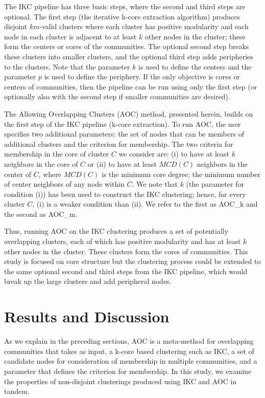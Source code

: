 \documentclass[12pt, oneside]{article}   	%
\begin{document}
The IKC pipeline has three basic steps, where the second and third steps are optional.  The first step (the iterative k-core extraction algorithm) produces disjoint $km$-valid clusters where each cluster has positive modularity and each node in each cluster is adjacent to at least $k$ other nodes in the cluster; these form the centers or cores of the communities. The optional second step breaks these clusters into smaller clusters, and the optional third step adds peripheries to the clusters.  Note that the parameter $k$ is used to define the centers and the parameter $p$ is used to define the periphery. If the only objective is cores or centers of communities, then the pipeline can be run using only the first step (or optionally also with the second step if smaller communities are desired).

The Allowing Overlapping Clusters (AOC) method, presented herein, builds on the first step of the IKC pipeline (k-core extraction). To run AOC, the user specifies two additional parameters:  
the set of nodes that can be members of  additional clusters and the criterion for membership.  The two criteria for membership in the core of cluster $C$ we consider are: (i) to have at least $k$ neighbors 
in the core of $C$ or (ii) to have at least $MCD(C)$ neighbors in the center of $C$, where $MCD(C)$ is the minimum core degree; the minimum number of center neighbors of any node within $C$. 
We note that $k$ (the parameter for condition (i)) has been used to construct the IKC clustering; hence, for every cluster $C$,  (i) is a weaker condition than (ii).
We refer to the first as AOC\_k and the second as AOC\_m.

Thus, running   AOC on the IKC clustering produces a set of potentially overlapping clusters, each of which has positive modularity and has at least $k$ other nodes in the cluster. These clusters form the cores of communities.  This study is focused on core structure but the clustering process could be extended to the same optional second and third steps from the IKC pipeline, which would break up the large clusters and add peripheral nodes. 

\section{Results and Discussion}

As we explain in the preceding sections, AOC is a meta-method for overlapping communities that takes as input, a k-core based clustering such as IKC, a set of candidate nodes for consideration of membership in multiple communities, and a parameter that defines the criterion for membership. In this study, we examine the properties of non-disjoint clusterings produced using IKC and AOC in tandem. 
\end{document}
